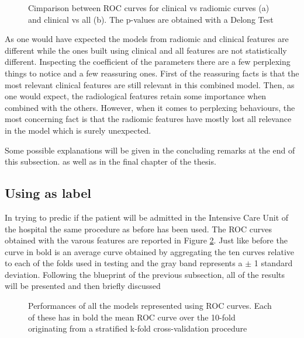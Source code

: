 \begin{figure}[H]
\centering
        \caption{Cimparison between ROC curves for clinical vs radiomic curves (a) and clinical vs all (b). The p-values are obtained with a Delong Test }\label{fig:delongDeath}
\end{figure}

As one would have expected the models from radiomic and clinical features are different while the ones built using clinical and all features are not statistically different.
Inspecting the coefficient of the parameters there are a few perplexing things to notice and a few reassuring ones. First of the reassuring facts is that the most relevant clinical features are still relevant in this combined model. 
Then, as one would expect, the radiological features retain some importance when combined with the others. However, when it comes to perplexing behaviours, the most concerning fact is that the radiomic features have mostly lost all relevance in the model which is surely unexpected.

Some possible explanations will be given in the concluding remarks at the end of this  subsection. as well as in the final chapter of the thesis.

\subsection{Using \icu as label}

In trying to predic if the patient will be admitted in the Intensive Care Unit of the hospital the same procedure as before has been used. The ROC curves obtained with the varous features are reported in Figure \ref{fig:ICULasso}. Just like before the curve in bold is an average curve obtained by aggregating the ten curves relative to each of the folds used in testing and the gray band represents a $\pm$ 1 standard deviation. Following the blueprint of the previous subsection, all of the results will be presented and then  briefly discussed


\begin{figure}[H]
\centering
	\newline
        \caption{Performances of all the models represented using ROC curves. Each of these has in bold the mean ROC curve over the 10-fold originating from a stratified k-fold cross-validation procedure}\label{fig:ICULasso}
\end{figure}

